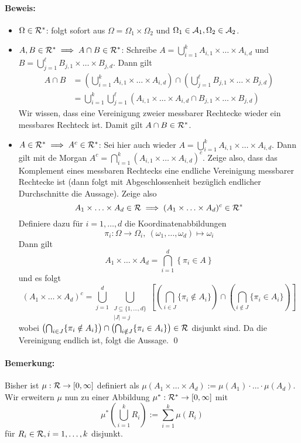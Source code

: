 \documentclass[11pt]{report}
\begin{document}
\paragraph{Beweis:}
\begin{itemize}
    \item $\Omega\in\mathcal{R}^*$: folgt sofort aus $\Omega=\Omega_1\times\Omega_2$ und $\Omega_1\in\mathcal{A}_1,\Omega_2\in\mathcal{A}_2$.
    \item $A,B\in\mathcal{R}^*\implies A\cap B\in\mathcal{R}^*$: Schreibe $A=\bigcup_{i=1}^kA_{i,1}\times\hdots\times A_{i,d}$ und $B=\bigcup_{j=1}^\ell B_{j,1}\times\hdots\times B_{j,d}$. Dann gilt
    \begin{align*}
        A\cap B&=\left(\bigcup_{i=1}^kA_{i,1}\times\hdots\times A_{i,d}\right)\cap\left(\bigcup_{j=1}^\ell B_{j,1}\times\hdots\times B_{j,d}\right)\\
        &=\bigcup_{i=1}^k\bigcup_{j=1}^\ell\left(A_{i,1}\times\hdots\times A_{i,d}\cap B_{j,1}\times\hdots\times B_{j,d}\right)
    \end{align*}
    Wir wissen, dass eine Vereinigung zweier messbarer Rechtecke wieder ein messbares Rechteck ist. Damit gilt $A\cap B\in\mathcal{R}^*$.
    \item $A\in\mathcal{R}^*\implies A^c\in\mathcal{R}^*$: Sei hier auch wieder $A=\bigcup_{i=1}^kA_{i,1}\times\hdots\times A_{i,d}$. Dann gilt mit de Morgan $A^c=\bigcap_{i=1}^k(A_{i,1}\times\hdots\times A_{i,d})^c$. Zeige also, dass das Komplement eines messbaren Rechtecks eine endliche Vereinigung messbarer Rechtecke ist (dann folgt mit Abgeschlossenheit bez\"uglich endlicher Durchschnitte die Aussage). Zeige also
    $$A_1\times\hdots\times A_d\in\mathcal{R}\implies(A_1\times\hdots\times A_d)^c\in\mathcal{R}^*$$
    Definiere dazu f\"ur $i=1,\hdots,d$ die Koordinatenabbildungen
    $$\pi_i:\Omega\to\Omega_i,\ (\omega_1,\hdots,\omega_d)\mapsto\omega_i$$
    Dann gilt
    $$A_1\times\hdots\times A_d=\bigcap_{i=1}^d\left\{\pi_i\in A\right\}$$
    und es folgt
    $$(A_1\times\hdots\times A_d)^c=\bigcup_{j=1}^d\bigcup_{\substack{J\subseteq\{1,\hdots,d\}\\|J|=j}}\left[\left(\bigcap_{i\in J}\{\pi_i\notin A_i\}\right)\cap\left(\bigcap_{i\notin J}\{\pi_i\in A_i\}\right)\right]$$
    wobei $\left(\bigcap_{i\in J}\{\pi_i\notin A_i\}\right)\cap\left(\bigcap_{i\notin J}\{\pi_i\in A_i\}\right)\in\mathcal{R}$ disjunkt sind. Da die Vereinigung endlich ist, folgt die Aussage. \qed
\end{itemize}

\paragraph{Bemerkung:} Bisher ist $\mu:\mathcal{R}\to[0,\infty]$ definiert als $\mu(A_1\times\hdots\times A_d):=\mu(A_1)\cdot\hdots\cdot\mu(A_d)$. Wir erweitern $\mu$ nun zu einer Abbildung $\mu^*:\mathcal{R}^*    \to[0,\infty]$ mit 
$$\displaystyle\mu^*\left(\bigcup_{i=1}^k R_i\right):=\sum_{i=1}^k\mu(R_i)$$ f\"ur $R_i\in\mathcal{R},i=1,\hdots,k$ disjunkt.
\end{document}
